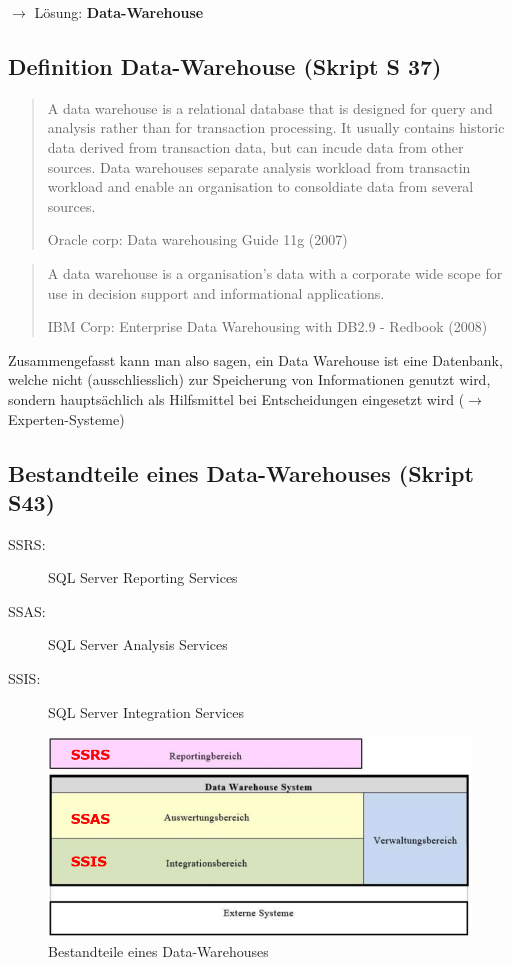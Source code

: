 \documentclass[a4paper, 11pt, nofootinbib]{article}
\begin{document}
$\rightarrow$ Lösung: \textbf{Data-Warehouse}

\newpage

\subsection{Definition Data-Warehouse (Skript S 37)}
	
\blockquote[Oracle corp: Data warehousing Guide 11g (2007)]{A data warehouse is a relational database that is designed for query and analysis rather than for transaction processing. It usually contains historic data derived from transaction data, but can incude data from other sources. Data warehouses separate analysis workload from transactin workload and enable an organisation to consoldiate data from several sources.} 
 

\blockquote[IBM Corp: Enterprise Data Warehousing with DB2.9 - Redbook (2008)]{A data warehouse is a organisation's data with a corporate wide scope for use in decision support and informational applications.}
\vspace*{10px}

Zusammengefasst kann man also sagen, ein Data Warehouse ist eine Datenbank, welche nicht (ausschliesslich) zur Speicherung von Informationen genutzt wird, sondern hauptsächlich als Hilfsmittel bei Entscheidungen eingesetzt wird ($\rightarrow$ Experten-Systeme)



\subsection{Bestandteile eines Data-Warehouses (Skript S43)}

\begin{description}
	\item [SSRS: ] SQL Server Reporting Services
	\item [SSAS: ] SQL Server Analysis Services
	\item [SSIS: ] SQL Server Integration Services
\end{description}

\begin{figure}[htb]
	\centering
	\includegraphics[keepaspectratio=true,height=15\baselineskip]{bestandteiledatawarehouse.PNG}
	\caption{Bestandteile eines Data-Warehouses}
	\label{fig:bstdw}
\end{figure}
\end{document}
